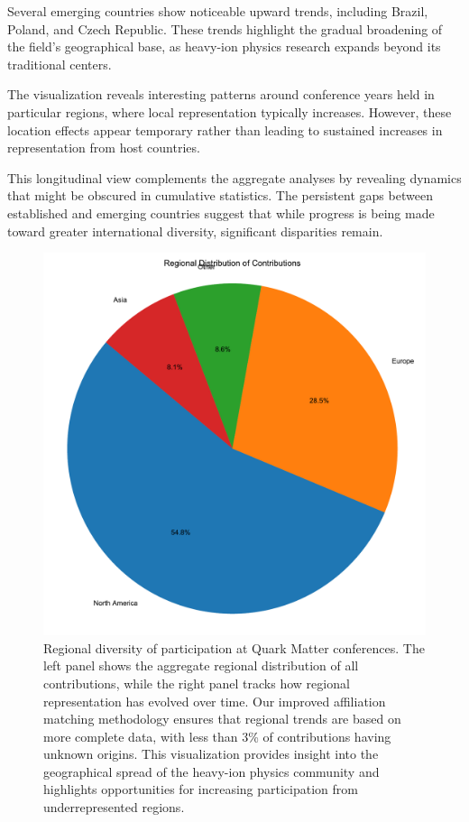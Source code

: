 \documentclass[a4paper,11pt]{article}
\begin{document}
Several emerging countries show noticeable upward trends, including Brazil, Poland, and Czech Republic. These trends highlight the gradual broadening of the field's geographical base, as heavy-ion physics research expands beyond its traditional centers.

The visualization reveals interesting patterns around conference years held in particular regions, where local representation typically increases. However, these location effects appear temporary rather than leading to sustained increases in representation from host countries.

This longitudinal view complements the aggregate analyses by revealing dynamics that might be obscured in cumulative statistics. The persistent gaps between established and emerging countries suggest that while progress is being made toward greater international diversity, significant disparities remain.

\begin{figure}[H]
\centering
\includegraphics[width=\textwidth]{figures/regional_diversity.pdf}
\caption{Regional diversity of participation at Quark Matter conferences. The left panel shows the aggregate regional distribution of all contributions, while the right panel tracks how regional representation has evolved over time. Our improved affiliation matching methodology ensures that regional trends are based on more complete data, with less than 3\% of contributions having unknown origins. This visualization provides insight into the geographical spread of the heavy-ion physics community and highlights opportunities for increasing participation from underrepresented regions.}
\label{fig:regional_diversity}
\end{figure}
\end{document}
